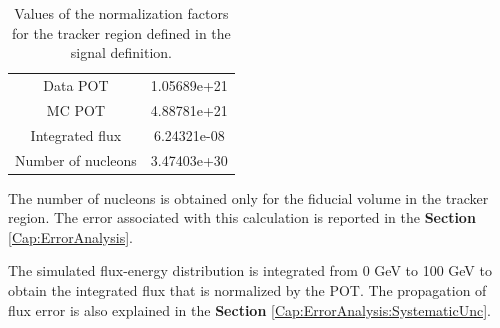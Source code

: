 \begin{table}[!h]
    \centering
    \begin{tabular}{c|c}
        Data POT & 1.05689e+21 \\
        MC POT & 4.88781e+21 \\
        Integrated flux & 6.24321e-08 \\
        Number of nucleons & 3.47403e+30
    \end{tabular}
    \caption{Values of the normalization factors for the tracker region defined in the signal definition.}
    \label{tab:Analysis:NormalizationFactors}
\end{table}

The number of nucleons is obtained only for the fiducial volume in the tracker region. The error associated with this calculation is reported in the \textbf{Section} \ref{Cap:ErrorAnalysis}.

The simulated flux-energy distribution is integrated from 0 GeV to 100 GeV to obtain the integrated flux that is normalized by the POT. The propagation of flux error is also explained in the \textbf{Section} \ref{Cap:ErrorAnalysis:SystematicUnc}.







